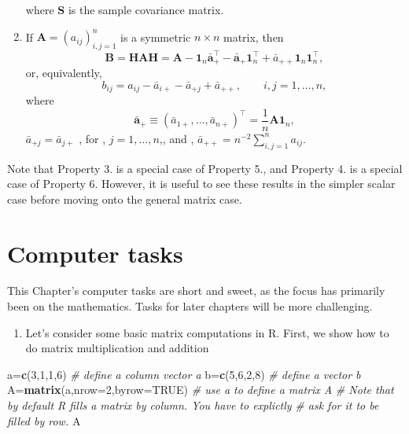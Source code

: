 \documentclass[
]{book}
\newenvironment{Shaded}{\begin{snugshade}}{\end{snugshade}}
\newcommand{\AttributeTok}[1]{\textcolor[rgb]{0.13,0.29,0.53}{#1}}
\newcommand{\CommentTok}[1]{\textcolor[rgb]{0.56,0.35,0.01}{\textit{#1}}}
\newcommand{\ConstantTok}[1]{\textcolor[rgb]{0.56,0.35,0.01}{#1}}
\newcommand{\DecValTok}[1]{\textcolor[rgb]{0.00,0.00,0.81}{#1}}
\newcommand{\FunctionTok}[1]{\textcolor[rgb]{0.13,0.29,0.53}{\textbf{#1}}}
\newcommand{\NormalTok}[1]{#1}
\newcommand{\OtherTok}[1]{\textcolor[rgb]{0.56,0.35,0.01}{#1}}
\providecommand{\tightlist}{%
  \setlength{\itemsep}{0pt}\setlength{\parskip}{0pt}}
\theoremstyle{definition}
\theoremstyle{definition}
\theoremstyle{definition}
\theoremstyle{definition}
\theoremstyle{remark}
\begin{document}
\begin{enumerate}
\[  \]
  where \(\mathbf S\) is the sample covariance matrix.
\item
  If \(\mathbf A=(a_{ij})_{i,j=1}^n\) is a symmetric \(n \times n\) matrix, then
  \[
  \mathbf B=\mathbf H\mathbf A\mathbf H= \mathbf A- {\mathbf 1}_n \bar{\mathbf a}_+^\top -\bar{\mathbf a}_+{\mathbf 1}_n^\top +\bar{a}_{++}{\mathbf 1}_n {\mathbf 1}_n^\top,
  \]
  or, equivalently,
  \[
  b_{ij}=a_{ij}-\bar{a}_{i+}-\bar{a}_{+j}+\bar{a}_{++}, \qquad i,j=1, \ldots , n,
  \]
  where
  \[
  \bar{\mathbf a}_{+}\equiv (\bar{a}_{1+}, \ldots , \bar{a}_{n+})^\top=\frac{1}{n}\mathbf A{\mathbf 1}_n,
  \]
  \(\bar{a}_{+j}=\bar{a}_{j+}\) , for , \(j=1, \ldots , n\),, and , \(\bar{a}_{++}=n^{-2}\sum_{i,j=1}^n a_{ij}\).
\end{enumerate}

Note that Property 3. is a special case of Property 5., and Property 4. is a special case of Property 6.
However, it is useful to see these results in the simpler scalar case before moving onto the general matrix case.

\section{Computer tasks}\label{tasks-ch2}

This Chapter's computer tasks are short and sweet, as the focus has primarily been on the mathematics. Tasks for later chapters will be more challenging.

\begin{enumerate}
\def\labelenumi{\arabic{enumi}.}
\setcounter{enumi}{-1}
\tightlist
\item
  Let's consider some basic matrix computations in R. First, we show how to do matrix multiplication and addition
\end{enumerate}

\begin{Shaded}
\begin{Highlighting}[]
\NormalTok{a}\OtherTok{=}\FunctionTok{c}\NormalTok{(}\DecValTok{3}\NormalTok{,}\DecValTok{1}\NormalTok{,}\DecValTok{1}\NormalTok{,}\DecValTok{6}\NormalTok{)                     }\CommentTok{\# define a column  vector a}
\NormalTok{b}\OtherTok{=}\FunctionTok{c}\NormalTok{(}\DecValTok{5}\NormalTok{,}\DecValTok{6}\NormalTok{,}\DecValTok{2}\NormalTok{,}\DecValTok{8}\NormalTok{)                     }\CommentTok{\# define a  vector b}
\NormalTok{A}\OtherTok{=}\FunctionTok{matrix}\NormalTok{(a,}\AttributeTok{nrow=}\DecValTok{2}\NormalTok{,}\AttributeTok{byrow=}\ConstantTok{TRUE}\NormalTok{)    }\CommentTok{\# use a to define a matrix A}
\CommentTok{\# Note that by default R fills a matrix by column. You have to explictly}
\CommentTok{\# ask for it to be filled by row.}
\NormalTok{A}
\end{Highlighting}
\end{Shaded}
\end{document}
